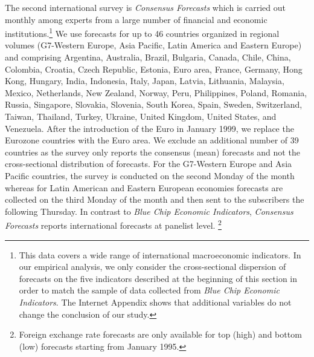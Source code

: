 The second international survey is \emph{Consensus Forecasts} which is carried out monthly among experts from a large number of financial and economic institutions.\footnote{This data covers a wide range of international macroeconomic indicators. In our empirical analysis, we only consider the cross-sectional dispersion of forecasts on the five indicators described at the beginning of this section in order to match the sample of data collected from \emph{Blue Chip Economic Indicators}. The Internet Appendix shows that additional variables do not change the conclusion of our study.} We use forecasts for up to 46 countries organized in regional volumes (G7-Western Europe, Asia Pacific, Latin America and Eastern Europe) and comprising Argentina, Australia, Brazil, Bulgaria, Canada, Chile, China, Colombia, Croatia, Czech Republic, Estonia, Euro area, France, Germany, Hong Kong, Hungary, India, Indonesia, Italy, Japan, Latvia, Lithuania, Malaysia, Mexico, Netherlands, New Zealand, Norway, Peru, Philippines, Poland, Romania, Russia, Singapore, Slovakia, Slovenia, South Korea, Spain, Sweden, Switzerland, Taiwan, Thailand, Turkey, Ukraine, United Kingdom, United States, and Venezuela. After the introduction of the Euro in January 1999, we replace the Eurozone countries  with the Euro area. We exclude an additional number of 39 countries as the survey only reports the consensus (mean) forecasts and not the cross-sectional distribution of forecasts. For the G7-Western Europe and Asia Pacific countries, the survey is conducted on the second Monday of the month whereas for Latin American and Eastern European economies forecasts are collected on the third Monday of the month and then sent to the subscribers the following Thursday. In contrast to \emph{Blue Chip Economic Indicators}, \emph{Consensus Forecasts} reports international forecasts at panelist level.%
\footnote{Foreign exchange rate forecasts are only available for top (high) and bottom (low) forecasts starting from January 1995.}



